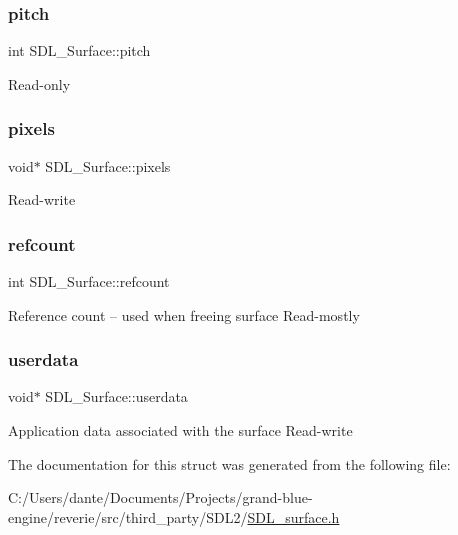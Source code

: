 \subsubsection{\texorpdfstring{pitch}{pitch}}
{\footnotesize\ttfamily int S\+D\+L\+\_\+\+Surface\+::pitch}

Read-\/only \mbox{\label{struct_s_d_l___surface_abd9597e0e084b8ef33fe0397bc26d911}} 
\subsubsection{\texorpdfstring{pixels}{pixels}}
{\footnotesize\ttfamily void$\ast$ S\+D\+L\+\_\+\+Surface\+::pixels}

Read-\/write \mbox{\label{struct_s_d_l___surface_a03d10628a359c0674f5ceffd574f1641}} 
\subsubsection{\texorpdfstring{refcount}{refcount}}
{\footnotesize\ttfamily int S\+D\+L\+\_\+\+Surface\+::refcount}

Reference count -- used when freeing surface Read-\/mostly \mbox{\label{struct_s_d_l___surface_ae66d973dcb9b57cb34815892e1ee1f31}} 
\subsubsection{\texorpdfstring{userdata}{userdata}}
{\footnotesize\ttfamily void$\ast$ S\+D\+L\+\_\+\+Surface\+::userdata}

Application data associated with the surface Read-\/write 

The documentation for this struct was generated from the following file\+:\begin{DoxyCompactItemize}
\item 
C\+:/\+Users/dante/\+Documents/\+Projects/grand-\/blue-\/engine/reverie/src/third\+\_\+party/\+S\+D\+L2/\mbox{\hyperlink{_s_d_l__surface_8h}{S\+D\+L\+\_\+surface.\+h}}\end{DoxyCompactItemize}
